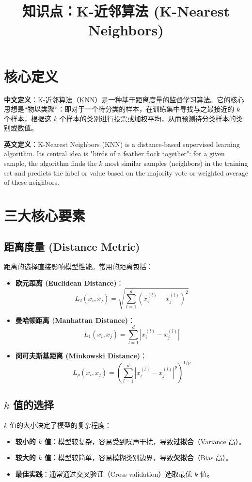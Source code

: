 \documentclass[12pt, a4paper]{article}
\title{知识点：K-近邻算法 (K-Nearest Neighbors)}
\author{}
\date{}
\begin{document}
\maketitle

\section{核心定义}
\textbf{中文定义}：K-近邻算法（KNN）是一种基于距离度量的监督学习算法。它的核心思想是“物以类聚”：即对于一个待分类的样本，在训练集中寻找与之最接近的 $k$ 个样本，根据这 $k$ 个样本的类别进行投票或加权平均，从而预测待分类样本的类别或数值。

\textbf{英文定义}：K-Nearest Neighbors (KNN) is a distance-based supervised learning algorithm. Its central idea is "birds of a feather flock together": for a given sample, the algorithm finds the $k$ most similar samples (neighbors) in the training set and predicts the label or value based on the majority vote or weighted average of these neighbors.

\section{三大核心要素}

\subsection{距离度量 (Distance Metric)}
距离的选择直接影响模型性能。常用的距离包括：
\begin{itemize}
    \item \textbf{欧元距离 (Euclidean Distance)}：
    $$ L_2(x_i, x_j) = \sqrt{\sum_{l=1}^d (x_i^{(l)} - x_j^{(l)})^2} $$
    \item \textbf{曼哈顿距离 (Manhattan Distance)}：
    $$ L_1(x_i, x_j) = \sum_{l=1}^d |x_i^{(l)} - x_j^{(l)}| $$
    \item \textbf{闵可夫斯基距离 (Minkowski Distance)}：
    $$ L_p(x_i, x_j) = \left( \sum_{l=1}^d |x_i^{(l)} - x_j^{(l)}|^p \right)^{1/p} $$
\end{itemize}

\subsection{$k$ 值的选择}
$k$ 值的大小决定了模型的复杂程度：
\begin{itemize}
    \item \textbf{较小的 $k$ 值}：模型较复杂，容易受到噪声干扰，导致\textbf{过拟合}（Variance 高）。
    \item \textbf{较大的 $k$ 值}：模型较简单，容易模糊类别边界，导致\textbf{欠拟合}（Bias 高）。
    \item \textbf{最佳实践}：通常通过交叉验证（Cross-validation）选取最优 $k$ 值。
\end{itemize}
\end{document}
